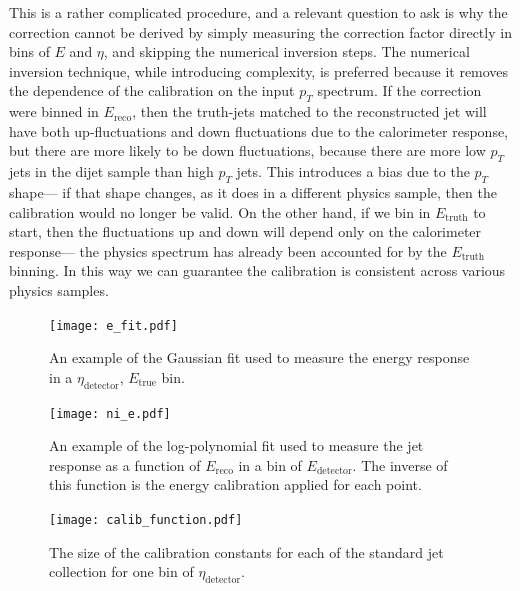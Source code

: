 This is a rather complicated procedure, and a relevant question to ask is why the correction cannot be derived by simply measuring the correction factor directly in bins of $E$ and $\eta$, and skipping the numerical inversion steps. The numerical inversion technique, while introducing complexity, is preferred because it removes the dependence of the calibration on the input $p_T$ spectrum. If the correction were binned in $E_{\mathrm{reco}}$, then the truth-jets matched to the reconstructed jet will have both up-fluctuations and down fluctuations due to the calorimeter response, but there are more likely to be down fluctuations, because there are more low $p_T$ jets in the dijet sample than high $p_T$ jets. This introduces a bias due to the $p_T$ shape--- if that shape changes, as it does in a different physics sample, then the calibration would no longer be valid. On the other hand, if we bin in $E_{\mathrm{truth}}$ to start, then the fluctuations up and down will depend only on the calorimeter response--- the physics spectrum has already been accounted for by the $E_{\mathrm{truth}}$ binning. In this way we can guarantee the calibration is consistent across various physics samples.



\begin{figure}
\centering
\texttt{[image: e\_fit.pdf]}
\label{fig:jet-reconstruction:e-fit}
\caption{An example of the Gaussian fit used to measure the energy response in a $\eta_\mathrm{detector}$, $E_\mathrm{true}$ bin.}
\end{figure}




\begin{figure}
\centering
\texttt{[image: ni\_e.pdf]}
\label{fig:jet-reconstruction:ni-e}
\caption{An example of the log-polynomial fit used to measure the jet response as a function of $E_\mathrm{reco}$ in a bin of $E_\mathrm{detector}$. The inverse of this function is the energy calibration applied for each point.}
\end{figure}



\begin{figure}
\centering
\texttt{[image: calib\_function.pdf]}
\label{fig:jet-reconstruction:calib-function}
\caption{The size of the calibration constants for each of the standard jet collection for one bin of $\eta_\mathrm{detector}$.}
\end{figure}

